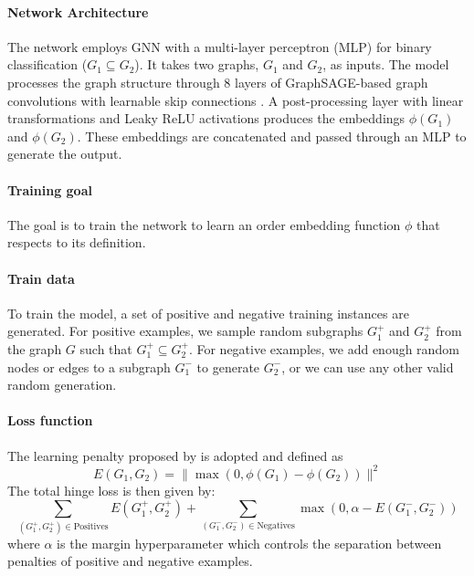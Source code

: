 \documentclass[pdflatex,sn-mathphys-num]{sn-jnl}%
\theoremstyle{thmstyleone}%
\theoremstyle{thmstyletwo}%
\theoremstyle{thmstylethree}%
\begin{document}
\paragraph{Network Architecture}
The network employs GNN with a multi-layer perceptron (MLP) for binary classification (\( G_1 \subseteq G_2 \)). It takes two graphs, \( G_1 \) and \( G_2 \), as inputs. The model processes the graph structure through 8 layers of GraphSAGE-based graph convolutions with learnable skip connections \cite{hamilton2018inductive}. A post-processing layer with linear transformations and Leaky ReLU activations produces the embeddings \( \phi(G_1) \) and \( \phi(G_2) \). These embeddings are concatenated and passed through an MLP to generate the output.


\paragraph{Training goal}
The goal is to train the network to learn an order
embedding function $\phi$ that respects to its definition.

\paragraph{Train data}
To train the model, a set of positive and negative training instances are generated. For positive examples, we sample random subgraphs \( G^+_1 \) and \( G^+_2 \) from the graph \( G \) such that \( G^+_1 \subseteq G^+_2 \). For negative examples, we add enough random nodes or edges to a subgraph \( G^-_1 \) to generate $G^-_2$, or we can use any other valid random generation.

\paragraph{Loss function}
The learning penalty proposed by \cite{ying2024representation} is adopted and defined as
\begin{equation}
E(G_1, G_2) = \|\max(0, \phi(G_1) - \phi(G_2))\|^2
\end{equation}
The total hinge loss is then given by:
\begin{equation}
\sum_{(G^+_1, G^+_2) \in \text{Positives}} E(G^+_1, G^+_2) + \sum_{\left(G^-_1, G^-_2\right) \in \text{Negatives}} \max \left(0, \alpha - E\left(G^-_1, G^-_2\right)\right)
\end{equation}
where \(\alpha\) is the margin hyperparameter which controls the separation between penalties of positive and negative examples.
\end{document}
